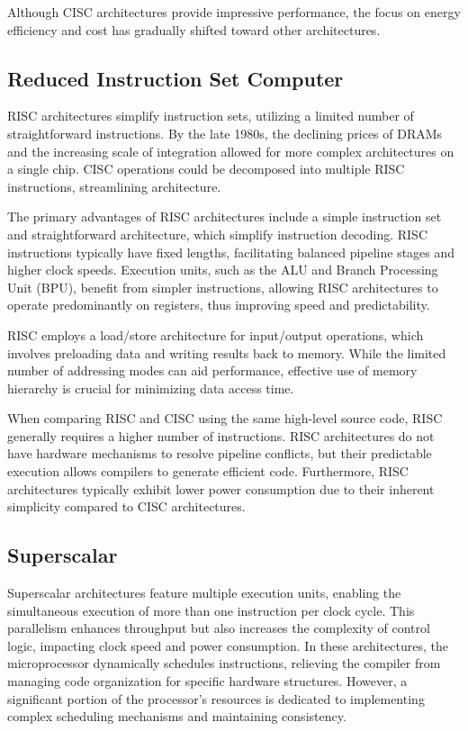 Although CISC architectures provide impressive performance, the focus on energy efficiency and cost has gradually shifted toward other architectures.

\subsection{Reduced Instruction Set Computer}
RISC architectures simplify instruction sets, utilizing a limited number of straightforward instructions. 
By the late 1980s, the declining prices of DRAMs and the increasing scale of integration allowed for more complex architectures on a single chip. 
CISC operations could be decomposed into multiple RISC instructions, streamlining architecture.

The primary advantages of RISC architectures include a simple instruction set and straightforward architecture, which simplify instruction decoding. 
RISC instructions typically have fixed lengths, facilitating balanced pipeline stages and higher clock speeds. 
Execution units, such as the ALU and Branch Processing Unit (BPU), benefit from simpler instructions, allowing RISC architectures to operate predominantly on registers, thus improving speed and predictability.

RISC employs a load/store architecture for input/output operations, which involves preloading data and writing results back to memory. 
While the limited number of addressing modes can aid performance, effective use of memory hierarchy is crucial for minimizing data access time.

When comparing RISC and CISC using the same high-level source code, RISC generally requires a higher number of instructions. 
RISC architectures do not have hardware mechanisms to resolve pipeline conflicts, but their predictable execution allows compilers to generate efficient code. 
Furthermore, RISC architectures typically exhibit lower power consumption due to their inherent simplicity compared to CISC architectures.

\subsection{Superscalar}
Superscalar architectures feature multiple execution units, enabling the simultaneous execution of more than one instruction per clock cycle. 
This parallelism enhances throughput but also increases the complexity of control logic, impacting clock speed and power consumption. 
In these architectures, the microprocessor dynamically schedules instructions, relieving the compiler from managing code organization for specific hardware structures. 
However, a significant portion of the processor's resources is dedicated to implementing complex scheduling mechanisms and maintaining consistency.

